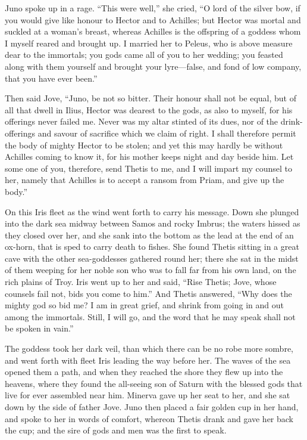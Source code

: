 Juno spoke up in a rage. “This were well,” she cried, “O lord of the
silver bow, if you would give like honour to Hector and to Achilles; but
Hector was mortal and suckled at a woman’s breast, whereas Achilles is the
offspring of a goddess whom I myself reared and brought up. I married her
to Peleus, who is above measure dear to the immortals; you gods came all
of you to her wedding; you feasted along with them yourself and brought
your lyre—false, and fond of low company, that you have ever been.”

Then said Jove, “Juno, be not so bitter. Their honour shall not be equal,
but of all that dwell in Ilius, Hector was dearest to the gods, as also to
myself, for his offerings never failed me. Never was my altar stinted of
its dues, nor of the drink-offerings and savour of sacrifice which we
claim of right. I shall therefore permit the body of mighty Hector to be
stolen; and yet this may hardly be without Achilles coming to know it, for
his mother keeps night and day beside him. Let some one of you, therefore,
send Thetis to me, and I will impart my counsel to her, namely that
Achilles is to accept a ransom from Priam, and give up the body.”

On this Iris fleet as the wind went forth to carry his message. Down she
plunged into the dark sea midway between Samos and rocky Imbrus; the
waters hissed as they closed over her, and she sank into the bottom as the
lead at the end of an ox-horn, that is sped to carry death to fishes. She
found Thetis sitting in a great cave with the other sea-goddesses gathered
round her; there she sat in the midst of them weeping for her noble son
who was to fall far from his own land, on the rich plains of Troy. Iris
went up to her and said, “Rise Thetis; Jove, whose counsels fail not, bids
you come to him.” And Thetis answered, “Why does the mighty god so bid me?
I am in great grief, and shrink from going in and out among the immortals.
Still, I will go, and the word that he may speak shall not be spoken in
vain.”

The goddess took her dark veil, than which there can be no robe more
sombre, and went forth with fleet Iris leading the way before her. The
waves of the sea opened them a path, and when they reached the shore they
flew up into the heavens, where they found the all-seeing son of Saturn
with the blessed gods that live for ever assembled near him. Minerva gave
up her seat to her, and she sat down by the side of father Jove. Juno then
placed a fair golden cup in her hand, and spoke to her in words of
comfort, whereon Thetis drank and gave her back the cup; and the sire of
gods and men was the first to speak.

